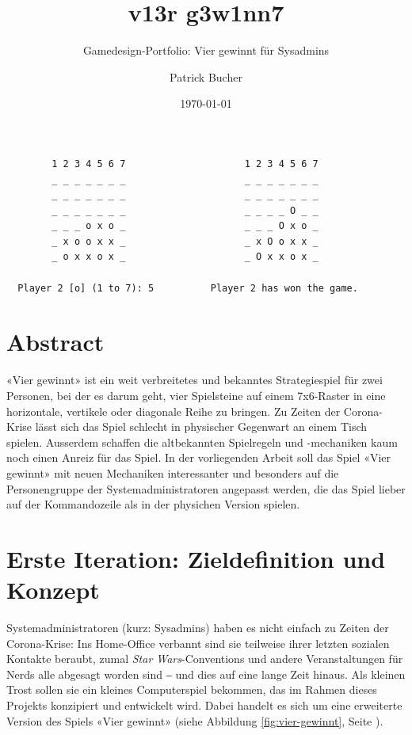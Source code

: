 \documentclass[a4paper,11pt,hidelinks]{scrartcl}
\newcommand{\imgref}[1]{{Abbildung \ref{#1}, Seite \pageref{#1}}}
\begin{document}
\author{Patrick Bucher}
\title{v13r g3w1nn7}
\subtitle{Gamedesign-Portfolio: Vier gewinnt für Sysadmins}
\date{\today}
\maketitle
\thispagestyle{empty}

\begin{center}
    \begin{lstlisting}
        1 2 3 4 5 6 7                     1 2 3 4 5 6 7
        _ _ _ _ _ _ _                     _ _ _ _ _ _ _
        _ _ _ _ _ _ _                     _ _ _ _ _ _ _
        _ _ _ _ _ _ _                     _ _ _ _ O _ _
        _ _ _ o x o _                     _ _ _ O x o _
        _ x o o x x _                     _ x O o x x _
        _ o x x o x _                     _ O x x o x _

  Player 2 [o] (1 to 7): 5          Player 2 has won the game.
    \end{lstlisting}
\end{center}

\section*{Abstract}

«Vier gewinnt» ist ein weit verbreitetes und bekanntes Strategiespiel für zwei Personen, bei der es darum geht, vier Spielsteine auf einem 7x6-Raster in eine horizontale, vertikele oder diagonale Reihe zu bringen. Zu Zeiten der Corona-Krise lässt sich das Spiel schlecht in physischer Gegenwart an einem Tisch spielen. Ausserdem schaffen die altbekannten Spielregeln und -mechaniken kaum noch einen Anreiz für das Spiel. In der vorliegenden Arbeit soll das Spiel «Vier gewinnt» mit neuen Mechaniken interessanter und besonders auf die Personengruppe der Systemadministratoren angepasst werden, die das Spiel lieber auf der Kommandozeile als in der physichen Version spielen.

\newpage

\tableofcontents
\newpage

\section{Erste Iteration: Zieldefinition und Konzept}

Systemadministratoren (kurz: Sysadmins) haben es nicht einfach zu Zeiten der Corona-Krise: Ins Home-Office verbannt sind sie teilweise ihrer letzten sozialen Kontakte beraubt, zumal \textit{Star Wars}-Conventions und andere Veranstaltungen für Nerds alle abgesagt worden sind ‒ und dies auf eine lange Zeit hinaus. Als kleinen Trost sollen sie ein kleines Computerspiel bekommen, das im Rahmen dieses Projekts konzipiert und entwickelt wird. Dabei handelt es sich um eine erweiterte Version des Spiels «Vier gewinnt» (siehe \imgref{fig:vier-gewinnt}).
\end{document}
